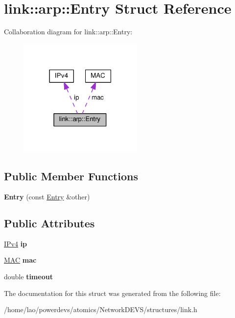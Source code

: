 \hypertarget{structlink_1_1arp_1_1Entry}{}\section{link\+:\+:arp\+:\+:Entry Struct Reference}
\label{structlink_1_1arp_1_1Entry}


Collaboration diagram for link\+:\+:arp\+:\+:Entry\+:
\nopagebreak
\begin{figure}[H]
\begin{center}
\leavevmode
\includegraphics[width=174pt]{structlink_1_1arp_1_1Entry__coll__graph}
\end{center}
\end{figure}
\subsection*{Public Member Functions}
\begin{DoxyCompactItemize}
\item 
{\bfseries Entry} (const \hyperlink{structlink_1_1arp_1_1Entry}{Entry} \&other)\hypertarget{structlink_1_1arp_1_1Entry_ab2adef8c42d08549d72c9fba0839da5c}{}\label{structlink_1_1arp_1_1Entry_ab2adef8c42d08549d72c9fba0839da5c}

\end{DoxyCompactItemize}
\subsection*{Public Attributes}
\begin{DoxyCompactItemize}
\item 
\hyperlink{structIPv4}{I\+Pv4} {\bfseries ip}\hypertarget{structlink_1_1arp_1_1Entry_a40929f76ac846faefab32e92b290c92f}{}\label{structlink_1_1arp_1_1Entry_a40929f76ac846faefab32e92b290c92f}

\item 
\hyperlink{structMAC}{M\+AC} {\bfseries mac}\hypertarget{structlink_1_1arp_1_1Entry_a72cdde0b5131b1ecc350f5ae28bb7f8a}{}\label{structlink_1_1arp_1_1Entry_a72cdde0b5131b1ecc350f5ae28bb7f8a}

\item 
double {\bfseries timeout}\hypertarget{structlink_1_1arp_1_1Entry_a8838c1d16cd38f16032703d00742df7a}{}\label{structlink_1_1arp_1_1Entry_a8838c1d16cd38f16032703d00742df7a}

\end{DoxyCompactItemize}


The documentation for this struct was generated from the following file\+:\begin{DoxyCompactItemize}
\item 
/home/lao/powerdevs/atomics/\+Network\+D\+E\+V\+S/structures/link.\+h\end{DoxyCompactItemize}

